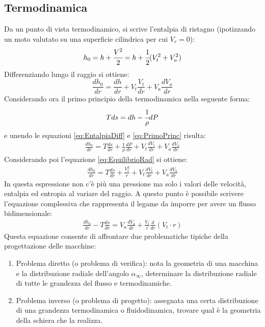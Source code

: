 \subsection{Termodinamica}
Da un punto di vista termodinamico, si scrive l'entalpia di ristagno (ipotizzando un moto valutato su una superficie cilindrica per cui $V_r = 0$):
\begin{align*}
h_0 = h + \cfrac{V^2}{2} = h + \cfrac{1}{2}(V_t^2 + V_a^2)
\end{align*}
Differenziando lungo il raggio si ottiene:
\begin{equation}
\frac{dh_0}{dr} = \frac{dh}{dr} + V_t \frac{V_t}{dr} + V_a \frac{dV_a}{dr}
\label{eq:EntalpiaDiff}
\end{equation}
Considerando ora il primo principio della termodinamica nella seguente forma:
\begin{equation}
Tds = dh - \cfrac{1}{\rho} dP
\label{eq:PrimoPrinc}
\end{equation}
e unendo le equazioni \ref{eq:EntalpiaDiff} e \ref{eq:PrimoPrinc} risulta:
\begin{align*}
\frac{dh_0}{dr} = T \frac{ds}{dr} + \frac{1}{\rho} \frac{dP}{dr} + V_t \frac{dV_t}{dr} + V_a \frac{dV_a}{dr}
\end{align*}
Considerando poi l'equazione \ref{eq:EquilibrioRad} si ottiene:
\begin{align*}
\frac{dh_0}{dr} = T \frac{ds}{dr} + \frac{V_t^2}{r} + V_t \frac{dV_t}{dr} + V_a \frac{dV_a}{dr}
\end{align*}
In questa espressione non c'è più una pressione ma solo i valori delle velocità, entalpia ed entropia al variare del raggio. A questo punto è possibile scrivere l'equazione complessiva che rappresenta il legame da imporre per avere un flusso bidimensionale:
\begin{align*}
\boxed{ \frac{dh_0}{dr} - T\frac{ds}{dr} = V_a \frac{dV_a}{dr} + \frac{V_t}{r} \frac{d}{dr}(V_t \cdot r)}
\end{align*}
Questa equazione consente di affrontare due problematiche tipiche della progettazione delle macchine:
\begin{enumerate}
\item Problema diretto (o problema di verifica): nota la geometria di una macchina e la distribuzione radiale dell'angolo $\alpha_{\infty}$, determinare la distribuzione radiale di tutte le grandezza del flusso e termodinamiche.
\item Problema inverso (o problema di progetto): assegnata una certa distribuzione di una grandezza termodinamica o fluidodinamica, trovare qual è la geometria della schiera che la realizza.
\end{enumerate}
